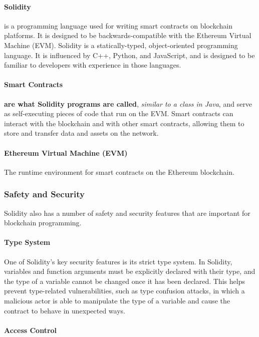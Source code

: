 \documentclass{article}
\theoremstyle{theorem}
\theoremstyle{definition}
\theoremstyle{remark}
\begin{document}
\paragraph{Solidity} is a programming language used for writing smart contracts on blockchain platforms. It is designed to be backwards-compatible with the Ethereum Virtual Machine (EVM). Solidity is a statically-typed, object-oriented programming language. It is influenced by C++, Python, and JavaScript, and is designed to be familiar to developers with experience in those languages. 

\paragraph{Smart Contracts} \textbf{are what Solidity programs are called}, \textit{similar to a class in Java}, and serve as self-executing pieces of code that run on the EVM. Smart contracts can interact with the blockchain and with other smart contracts, allowing them to store and transfer data and assets on the network.

\paragraph{Ethereum Virtual Machine (EVM)}
The runtime environment for smart contracts on the Ethereum blockchain.

\subsubsection{Safety and Security}
Solidity also has a number of safety and security features that are important for blockchain programming.

\paragraph{Type System}

One of Solidity's key security features is its strict type system. In Solidity, variables and function arguments must be explicitly declared with their type, and the type of a variable cannot be changed once it has been declared. This helps prevent type-related vulnerabilities, such as type confusion attacks, in which a malicious actor is able to manipulate the type of a variable and cause the contract to behave in unexpected ways.

\paragraph{Access Control}
\end{document}
